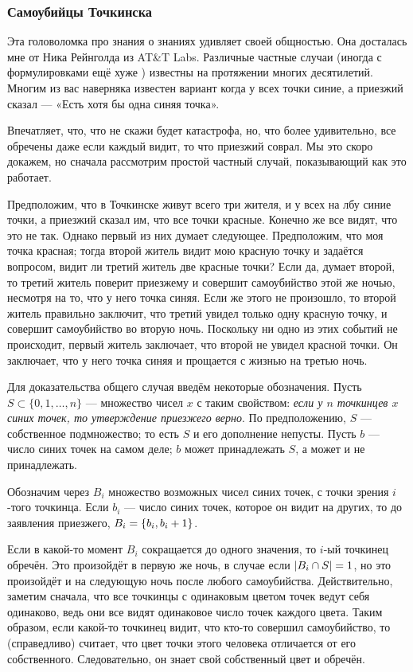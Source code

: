 \subsubsection*{Самоубийцы Точкинска}

Эта головоломка про знания о знаниях удивляет своей общностью.
Она досталась мне от Ника Рейнголда из AT\&T Labs.
Различные частные случаи (иногда с формулировками ещё хуже%
) известны на протяжении многих десятилетий.
Многим из вас наверняка известен вариант когда у всех точки синие, а приезжий сказал --- «Есть хотя бы одна синяя точка».

Впечатляет, что, что не скажи будет катастрофа,
но, что более удивительно, все обречены даже если каждый видит, то что приезжий соврал. 
Мы это скоро докажем, но сначала рассмотрим простой частный случай, показывающий как это работает.

Предположим, что в Точкинске живут всего три жителя, и у всех на лбу синие точки,
а приезжий сказал им, что все точки красные.
Конечно же все видят, что это не так.
Однако первый из них думает следующее.
Предположим, что моя точка красная; тогда второй житель видит мою красную точку и задаётся вопросом, видит ли третий житель две красные точки?
Если да, думает второй, то третий житель поверит приезжему и совершит самоубийство этой же ночью, несмотря на то, что у него точка синяя.
Если же этого не произошло, то второй житель правильно заключит, что третий увидел только одну красную точку, и совершит самоубийство во вторую ночь.
Поскольку ни одно из этих событий не происходит, первый житель заключает, что второй не увидел красной точки.
Он заключает, что у него точка синяя и прощается с жизнью на третью ночь.

Для доказательства общего случая введём некоторые обозначения.
Пусть $S\subset\{0,1,\dots,n\}$ --- множество чисел $x$ с таким свойством: \emph{если у $n$ точкинцев $x$ синих точек, то утверждение приезжего верно}.
По предположению, $S$ --- собственное подмножество; то есть $S$ и его дополнение непусты.
Пусть $b$ --- число синих точек на самом деле;
$b$ может принадлежать $S$, а может и не принадлежать.

Обозначим через $B_i$ множество возможных чисел синих точек, с точки зрения $i$-того точкинца.
Если $b_i$ --- число синих точек, которое он видит на других, то до заявления приезжего, $B_i=\{b_i,b_i\z+1\}$.

Если в какой-то момент $B_i$ сокращается до одного значения, то $i$-ый точкинец обречён.
Это произойдёт в первую же ночь, в случае если  $|B_i\z\cap S|=1$, но это произойдёт и на следующую ночь после любого самоубийства.
Действительно, заметим сначала, что все точкинцы с одинаковым цветом точек ведут себя одинаково, ведь они все видят одинаковое число точек каждого цвета.
Таким образом, если какой-то точкинец видит, что кто-то совершил самоубийство, то (справедливо) считает, что цвет точки этого человека отличается от его собственного. 
Следовательно, он знает свой собственный цвет и обречён.

